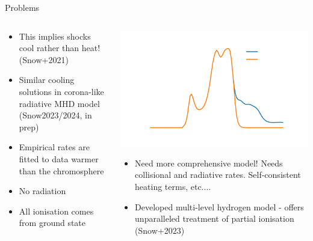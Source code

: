 \documentclass[10pt,aspectratio=169,usenames,dvipsnames]{beamer}
\begin{document}
\begin{frame}{Problems}
\begin{columns}
\begin{column}{0.4\textwidth}
\begin{itemize}
\item This implies shocks cool rather than heat! (Snow+2021)
\item Similar cooling solutions in corona-like radiative MHD model (Snow2023/2024, in prep)  
\item Empirical rates are fitted to data warmer than the chromosphere
\item No radiation
\item All ionisation comes from ground state
\end{itemize}
\end{column}
\begin{column}{0.6\textwidth}
\includegraphics[width=0.9\linewidth]{2023StAndrewsAstro/Figures/KHIrl2D_lossprofile.png}
\begin{itemize}
\item Need more comprehensive model! Needs collisional and radiative rates. Self-consistent heating terms, etc.... 
\item Developed multi-level hydrogen model - offers unparalleled treatment of partial ionisation (Snow+2023)
\end{itemize}
\end{column}
\end{columns}
\end{frame}
\end{document}
